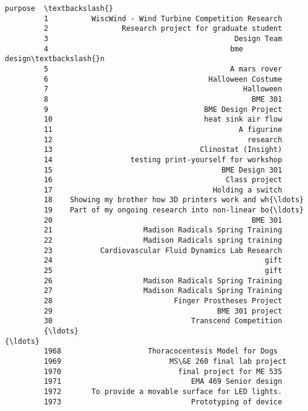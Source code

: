 \documentclass[11pt]{article}
\begin{document}
\begin{Verbatim}[commandchars=\\\{\}]
                                                         purpose  \textbackslash{}
         1          WiscWind - Wind Turbine Competition Research   
         2                 Research project for graduate student   
         3                                           Design Team   
         4                                          bme design\textbackslash{}n   
         5                                          A mars rover   
         6                                     Halloween Costume   
         7                                             Halloween   
         8                                               BME 301   
         9                                    BME Design Project   
         10                                   heat sink air flow   
         11                                           A figurine   
         12                                             research   
         13                                  Clinostat (Insight)   
         14                  testing print-yourself for workshop   
         15                                       BME Design 301   
         16                                        Class project   
         17                                     Holding a switch   
         18    Showing my brother how 3D printers work and wh{\ldots}   
         19    Part of my ongoing research into non-linear bo{\ldots}   
         20                                              BME 301   
         21                     Madison Radicals Spring Training   
         22                     Madison Radicals spring training   
         23           Cardiovascular Fluid Dynamics Lab Research   
         24                                                 gift   
         25                                                 gift   
         26                     Madison Radicals Spring Training   
         27                     Madison Radicals Spring Training   
         28                            Finger Prostheses Project   
         29                                      BME 301 project   
         30                                Transcend Competition   
         {\ldots}                                                 {\ldots}   
         1968                    Thoracocentesis Model for Dogs    
         1969                         MS\&E 260 final lab project   
         1970                           final project for ME 535   
         1971                              EMA 469 Senior design   
         1972       To provide a movable surface for LED lights.   
         1973                              Prototyping of device   

\end{Verbatim}
\end{document}
